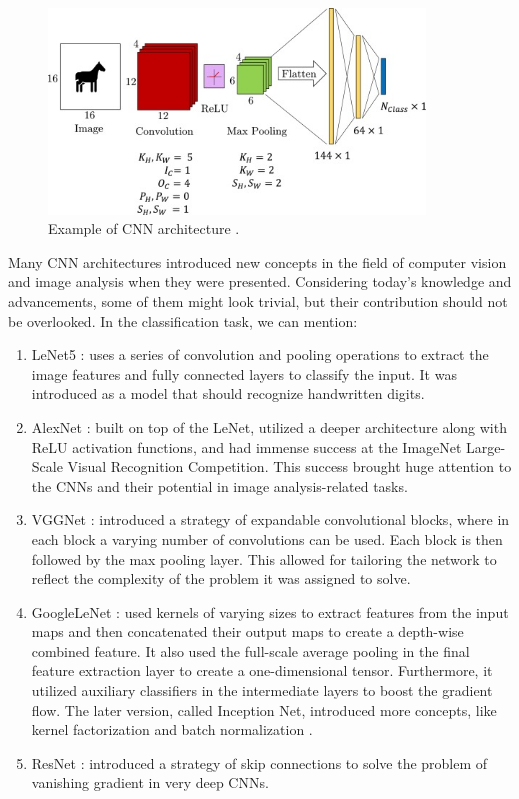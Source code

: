 \begin{figure}[H]
\begin{centering}
\includegraphics[width=10cm]{assets/images/cnn-full.jpg}
\par\end{centering}
\caption{Example of CNN architecture \cite{Santosh2022-2}.}
\label{fig:full-cnn}
\end{figure}

Many CNN architectures introduced new concepts in the field of computer vision and image analysis when they were presented. Considering today's knowledge and advancements, some of them might look trivial, but their contribution should not be overlooked. In the classification task, we can mention:

\begin{enumerate}
    \item LeNet5 \cite{LeCun2015-2}: uses a series of convolution and pooling operations to extract the image features and fully connected layers to classify the input. It was introduced as a model that should recognize handwritten digits.
    \item AlexNet \cite{Krizhevsky2012}: built on top of the LeNet, utilized a deeper architecture along with ReLU activation functions, and had immense success at the ImageNet Large-Scale Visual Recognition Competition. This success brought huge attention to the  CNNs and their potential in image analysis-related tasks.
    \item VGGNet \cite{Simonyan2014}: introduced a strategy of expandable convolutional blocks, where in each block a varying number of convolutions can be used. Each block is then followed by the max pooling layer. This allowed for tailoring the network to reflect the complexity of the problem it was assigned to solve.
    \item GoogleLeNet \cite{Szegedy2015}: used kernels of varying sizes to extract features from the input maps and then concatenated their output maps to create a depth-wise combined feature. It also used the full-scale average pooling in the final feature extraction layer to create a one-dimensional tensor. Furthermore, it utilized auxiliary classifiers in the intermediate layers to boost the gradient flow. The later version, called Inception Net, introduced more concepts, like kernel factorization and batch normalization \cite{Szegedy2016-2}.
    \item ResNet \cite{He2016}: introduced a strategy of skip connections to solve the problem of vanishing gradient in very deep CNNs. 
\end{enumerate}

